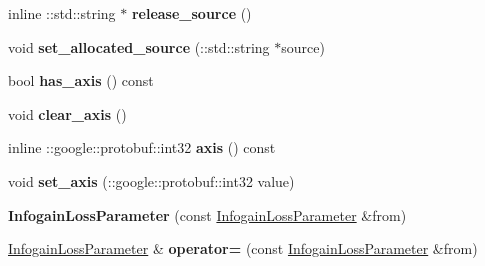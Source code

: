 \begin{DoxyCompactItemize}
\item 
\mbox{\label{classcaffe_1_1_infogain_loss_parameter_ac92ee3e1b95b022c80f437f287c2a187}} 
inline \+::std\+::string $\ast$ {\bfseries release\+\_\+source} ()
\item 
\mbox{\label{classcaffe_1_1_infogain_loss_parameter_a6b0d4a74ce4a8844f77d4e045e3be89b}} 
void {\bfseries set\+\_\+allocated\+\_\+source} (\+::std\+::string $\ast$source)
\item 
\mbox{\label{classcaffe_1_1_infogain_loss_parameter_a710591dd61782c1bb8d18e5738801852}} 
bool {\bfseries has\+\_\+axis} () const
\item 
\mbox{\label{classcaffe_1_1_infogain_loss_parameter_a49902cd5da84b3ee02ac2961d9091d74}} 
void {\bfseries clear\+\_\+axis} ()
\item 
\mbox{\label{classcaffe_1_1_infogain_loss_parameter_a98c9668a92f352d3debc7fa4671c9acb}} 
inline \+::google\+::protobuf\+::int32 {\bfseries axis} () const
\item 
\mbox{\label{classcaffe_1_1_infogain_loss_parameter_ac3594df9ee51b1e0af0a36738971b56c}} 
void {\bfseries set\+\_\+axis} (\+::google\+::protobuf\+::int32 value)
\item 
\mbox{\label{classcaffe_1_1_infogain_loss_parameter_aa2d3bbda08f3993b6e1aabef8a043544}} 
{\bfseries Infogain\+Loss\+Parameter} (const \mbox{\hyperlink{classcaffe_1_1_infogain_loss_parameter}{Infogain\+Loss\+Parameter}} \&from)
\item 
\mbox{\label{classcaffe_1_1_infogain_loss_parameter_ac56f1542914d110ad8794d3c765029fb}} 
\mbox{\hyperlink{classcaffe_1_1_infogain_loss_parameter}{Infogain\+Loss\+Parameter}} \& {\bfseries operator=} (const \mbox{\hyperlink{classcaffe_1_1_infogain_loss_parameter}{Infogain\+Loss\+Parameter}} \&from)
\item 
\mbox{\label{classcaffe_1_1_infogain_loss_parameter_acf3b154c5250fec8e5df04e22ee25439}} 

\end{DoxyCompactItemize}
